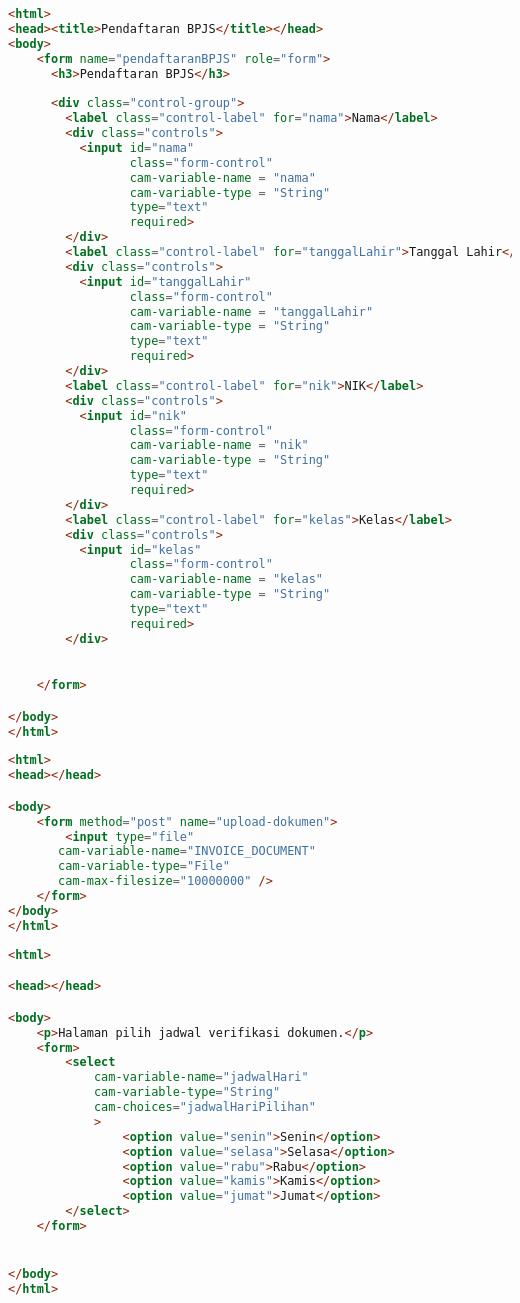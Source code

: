 \begin{lstlisting}[language=html,basicstyle=\tiny,caption=pendaftaran-bpjs.html]
<html>
<head><title>Pendaftaran BPJS</title></head>
<body>
	<form name="pendaftaranBPJS" role="form">
	  <h3>Pendaftaran BPJS</h3>
	  
	  <div class="control-group">
		<label class="control-label" for="nama">Nama</label>
	    <div class="controls">
	      <input id="nama"
	             class="form-control"
	             cam-variable-name = "nama"
	             cam-variable-type = "String"
	             type="text"
	             required>
	    </div>	
		<label class="control-label" for="tanggalLahir">Tanggal Lahir</label>
	    <div class="controls">
	      <input id="tanggalLahir"
	             class="form-control"
	             cam-variable-name = "tanggalLahir"
	             cam-variable-type = "String"
	             type="text"
	             required>
	    </div>		
		<label class="control-label" for="nik">NIK</label>
	    <div class="controls">
	      <input id="nik"
	             class="form-control"
	             cam-variable-name = "nik"
	             cam-variable-type = "String"
	             type="text"
	             required>
	    </div>		
		<label class="control-label" for="kelas">Kelas</label>
	    <div class="controls">
	      <input id="kelas"
	             class="form-control"
	             cam-variable-name = "kelas"
	             cam-variable-type = "String"
	             type="text"
	             required>
	    </div>
	    

	</form>

</body>
</html>
\end{lstlisting}

\begin{lstlisting}[language=html,basicstyle=\tiny,caption=upload-dokumen.html]
<html>
<head></head>

<body>
	<form method="post" name="upload-dokumen">
		<input type="file"
       cam-variable-name="INVOICE_DOCUMENT"
       cam-variable-type="File"
       cam-max-filesize="10000000" />
	</form>
</body>
</html>
\end{lstlisting}

\begin{lstlisting}[language=html,basicstyle=\tiny,caption=pilih-jadwal.html]
<html>

<head></head>

<body>
	<p>Halaman pilih jadwal verifikasi dokumen.</p>
	<form>
		<select 
			cam-variable-name="jadwalHari"
			cam-variable-type="String"
	        cam-choices="jadwalHariPilihan"
	        >
		  		<option value="senin">Senin</option>
		  		<option value="selasa">Selasa</option>
		  		<option value="rabu">Rabu</option>
		  		<option value="kamis">Kamis</option>
		  		<option value="jumat">Jumat</option>
		</select>
	</form>


</body>
</html>
\end{lstlisting}

